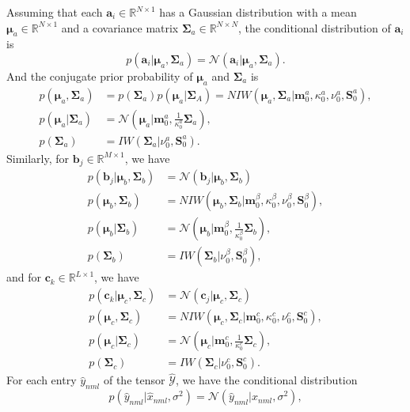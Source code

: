 \documentclass{article}
\newcommand{\bs}[1]{\boldsymbol{#1}}
\begin{document}
\begin{flushleft}
Assuming that each $\bs{a}_i \in \mathbb{R}^{N \times 1}$ has a Gaussian distribution with a mean $\bs{\mu}_a \in \mathbb{R}^{N \times 1}$ and a covariance matrix $\bs{\Sigma}_a \in \mathbb{R}^{N \times N}$, the conditional distribution of $\bs{a}_i$ is 
\begin{equation}
	p(\bs{a}_i|\bs{\mu}_a,\bs{\Sigma}_a)=\mathcal{N}(\bs{a}_i|\bs{\mu}_a,\bs{\Sigma}_a).
\end{equation}
And the conjugate prior probability of $\bs{\mu}_a$ and $\bs{\Sigma}_a$ is
\begin{align}
	p(\bs{\mu}_a, \bs{\Sigma}_a) &= p(\bs{\Sigma}_a)p(\bs{\mu}_a|\bs{\Sigma}_A)=NIW(\bs{\mu}_a, \bs{\Sigma}_a|\bs{m}^a_0,\kappa^a_0,\nu^a_0,\bs{S}^a_0), \\
	p(\bs{\mu}_a|\bs{\Sigma}_a) &= \mathcal{N}(\bs{\mu}_a|\bs{m}^a_0, \frac{1}{\kappa^a_0}\bs{\Sigma}_a),\\
	p(\bs{\Sigma}_a) &= IW(\bs{\Sigma}_a|\nu^a_0, \bs{S}^a_0).
\end{align}
Similarly, for $\bs{b}_j \in \mathbb{R}^{M \times 1}$, we have
\begin{align}
p(\bs{b}_j|\bs{\mu}_b,\bs{\Sigma}_b)&=\mathcal{N}(\bs{b}_j|\bs{\mu}_b,\bs{\Sigma}_b)\\
p(\bs{\mu}_b, \bs{\Sigma}_b) &=NIW(\bs{\mu}_b, \bs{\Sigma}_b|\bs{m}^\beta_0,\kappa^\beta_0,\nu^\beta_0,\bs{S}^\beta_0), \\
	p(\bs{\mu}_b|\bs{\Sigma}_b) &= \mathcal{N}(\bs{\mu}_b|\bs{m}^\beta_0, \frac{1}{\kappa^\beta_0}\bs{\Sigma}_b),\\
	p(\bs{\Sigma}_b) &= IW(\bs{\Sigma}_b|\nu^\beta_0, \bs{S}^\beta_0),
\end{align}
and for $\bs{c}_k \in \mathbb{R}^{L \times 1}$, we have
\begin{align}
	p(\bs{c}_k|\bs{\mu}_c,\bs{\Sigma}_c)&=\mathcal{N}(\bs{c}_j|\bs{\mu}_c,\bs{\Sigma}_c)\\
p(\bs{\mu}_c, \bs{\Sigma}_c) &=NIW(\bs{\mu}_c, \bs{\Sigma}_c|\bs{m}^c_0,\kappa^c_0,\nu^c_0,\bs{S}^c_0), \\
	p(\bs{\mu}_c|\bs{\Sigma}_c) &= \mathcal{N}(\bs{\mu}_c|\bs{m}^c_0, \frac{1}{\kappa^c_0}\bs{\Sigma}_c),\\
	p(\bs{\Sigma}_c) &= IW(\bs{\Sigma}_c|\nu^c_0, \bs{S}^c_0).
\end{align}
For each entry $\hat{y}_{nml}$ of the tensor $\mathcal{\hat{Y}}$, we have the conditional distribution
\begin{equation}
	p(\hat{y}_{nml}|\hat{x}_{nml}, \sigma^2) = \mathcal{N}(\hat{y}_{nml}|\hat{x}_{nml}, \sigma^2),

\end{equation}
\end{flushleft}
\end{document}
